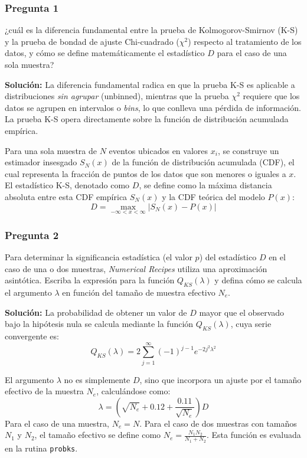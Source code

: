 \documentclass[a4paper]{article}
\begin{document}
\subsubsection{Pregunta 1}
¿cuál es la diferencia fundamental entre la prueba de Kolmogorov-Smirnov (K-S) y la prueba de bondad de ajuste Chi-cuadrado ($\chi^2$) respecto al tratamiento de los datos, y cómo se define matemáticamente el estadístico $D$ para el caso de una sola muestra?

\textbf{Solución:}
La diferencia fundamental radica en que la prueba K-S es aplicable a distribuciones \textit{sin agrupar} (unbinned), mientras que la prueba $\chi^2$ requiere que los datos se agrupen en intervalos o \textit{bins}, lo que conlleva una pérdida de información. La prueba K-S opera directamente sobre la función de distribución acumulada empírica. 

Para una sola muestra de $N$ eventos ubicados en valores $x_i$, se construye un estimador insesgado $S_N(x)$ de la función de distribución acumulada (CDF), el cual representa la fracción de puntos de los datos que son menores o iguales a $x$. El estadístico K-S, denotado como $D$, se define como la máxima distancia absoluta entre esta CDF empírica $S_N(x)$ y la CDF teórica del modelo $P(x)$:
$$ D = \max_{-\infty < x < \infty} |S_N(x) - P(x)| $$

\subsubsection{Pregunta 2}
Para determinar la significancia estadística (el valor $p$) del estadístico $D$ en el caso de una o dos muestras, \textit{Numerical Recipes} utiliza una aproximación asintótica. Escriba la expresión para la función $Q_{KS}(\lambda)$ y defina cómo se calcula el argumento $\lambda$ en función del tamaño de muestra efectivo $N_e$.

\textbf{Solución:}
La probabilidad de obtener un valor de $D$ mayor que el observado bajo la hipótesis nula se calcula mediante la función $Q_{KS}(\lambda)$, cuya serie convergente es:
$$ Q_{KS}(\lambda) = 2 \sum_{j=1}^{\infty} (-1)^{j-1} e^{-2j^2\lambda^2} $$

El argumento $\lambda$ no es simplemente $D$, sino que incorpora un ajuste por el tamaño efectivo de la muestra $N_e$, calculándose como:
$$ \lambda = \left( \sqrt{N_e} + 0.12 + \frac{0.11}{\sqrt{N_e}} \right) D $$
Para el caso de una muestra, $N_e = N$. Para el caso de dos muestras con tamaños $N_1$ y $N_2$, el tamaño efectivo se define como $N_e = \frac{N_1 N_2}{N_1 + N_2}$. Esta función es evaluada en la rutina \texttt{probks}.
\end{document}
